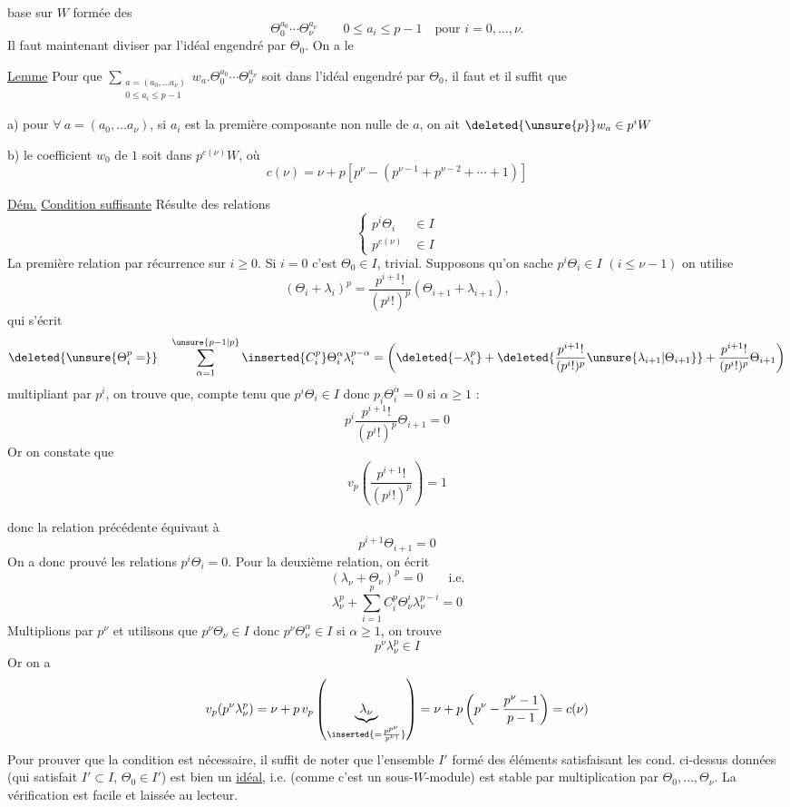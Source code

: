 base sur $W$ formée des
\[
\Theta_0^{a_0}\cdots\Theta_\nu^{a_\nu}\qquad 0\leq a_i\leq p-1\quad\text{pour }i=0,\ldots,\nu.
\]
Il faut maintenant diviser par l'idéal  engendré par $\Theta_0$. On a le

\uline{Lemme} Pour que $\displaystyle\sum_{\substack{a=(a_0,\ldots a_\nu)\\0\leq a_i\leq p-1}}w_a.\Theta_0^{a_0}\cdots\Theta_\nu^{a_\nu}$ soit dans l'idéal engendré par $\Theta_0$, il faut et il suffit que

a) pour $\forall\ a=(a_0,\ldots a_\nu)$, si  $a_i$ est la première composante non nulle de $a$, on ait $\deleted{\unsure{p}}w_a\in p^iW$

b) le coefficient $w_0$ de $1$ soit dans $p^{c(\nu)}W$, où
\[
c(\nu)=\nu+p[p^\nu-(p^{\nu-1}+p^{\nu-2}+\cdots+1)]
\]

\uline{Dém.} \uline{Condition suffisante} Résulte des relations
\[
\left\{\begin{aligned}p^i\Theta_i&\in I\\p^{c(\nu)}&\in I\end{aligned}\right.
\]
La première relation par récurrence sur $i\geq0$. Si $i=0$ c'est $\Theta_0\in I$,  trivial. Supposons qu'on sache $p^i\Theta_i\in I$ $(i\leq\nu-1)$ on utilise
\[
(\Theta_i+\lambda_i)^p=\frac{p^{i+1}!}{(p^i!)^p}(\Theta_{i+1}+\lambda_{i+1}),
\]
qui s'écrit
\[
\deleted{\unsure{\Theta_i^p=}}\quad\sum_{\alpha=1}^{\unsure{p-1|p}}\inserted{C_i^p}\Theta_i^\alpha\lambda_i^{p-\alpha}
=\left(\deleted{-\lambda_i^p}+\deleted{\frac{p^{i+1}!}{(p^i!)^p}\unsure{\lambda_{i+1}|\Theta_{i+1}}}+\frac{p^{i+1}!}{(p^i!)^p}\Theta_{i+1}\right)
\]
multipliant par $p^i$, on trouve que, compte tenu que $p^i\Theta_i\in I$ donc $p_i\Theta_i^\alpha=0$ si $\alpha\geq1$ :
\[
p^i\frac{p^{i+1}!}{(p^i!)^p}\Theta_{i+1}=0
\]
Or on constate que
\[
v_p\left(\frac{p^{i+1}!}{(p^i!)^p}\right)=1
\]


donc la relation précédente équivaut à
\[
p^{i+1}\Theta_{i+1}=0
\]
On a donc prouvé les relations $p^i\Theta_i=0$. Pour la deuxième relation, on écrit
\[
(\lambda_\nu+\Theta_\nu)^p=0\qquad\text{i.e.}
\]
\[
\lambda_\nu^p+\sum_{i=1}^p C_i^p\Theta_\nu^i\lambda_\nu^{p-i}=0
\]
Multiplions par $p^\nu$ et utilisons que $p^\nu\Theta_\nu\in I$ donc $p^\nu\Theta_\nu^\alpha\in I$ si $\alpha\geq1$, on trouve
\[
p^\nu\lambda_\nu^p\in I
\]
Or on a
\[
v_p(p^\nu\lambda_\nu^p)=\nu+p\,v_p\left(\underbrace{\lambda_\nu}_{\inserted{=\frac{p^{p^\nu}}{p^\nu!}}}\right)=\nu+p\left(p^\nu-\frac{p^\nu-1}{p-1}\right)=c(\nu)
\]
Pour prouver que la condition est nécessaire, il suffit de noter que l'ensemble $I'$ formé des éléments satisfaisant les cond.  ci-dessus données (qui satisfait $I'\subset I$, $\Theta_0\in I'$) est bien un \uline{idéal}, i.e.  (comme c'est un sous-$W$-module) est stable par multiplication par $\Theta_0,\ldots,\Theta_\nu$. La vérification est facile et laissée au lecteur.

